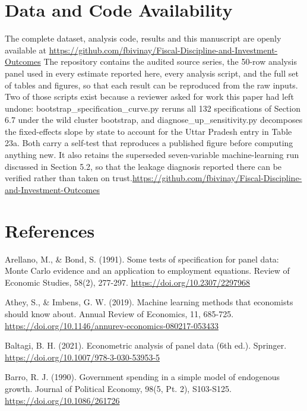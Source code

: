 \documentclass[12pt,a4paper]{article}
\begin{document}
\FloatBarrier
\section{Data and Code Availability}

The complete dataset, analysis code, results and this manuscript are openly available at \url{https://github.com/fbivinay/Fiscal-Discipline-and-Investment-Outcomes} The repository contains the audited source series, the 50-row analysis panel used in every estimate reported here, every analysis script, and the full set of tables and figures, so that each result can be reproduced from the raw inputs. Two of those scripts exist because a reviewer asked for work this paper had left undone: bootstrap\_specification\_curve.py reruns all 132 specifications of Section 6.7 under the wild cluster bootstrap, and diagnose\_up\_sensitivity.py decomposes the fixed-effects slope by state to account for the Uttar Pradesh entry in Table 23a. Both carry a self-test that reproduces a published figure before computing anything new. It also retains the superseded seven-variable machine-learning run discussed in Section 5.2, so that the leakage diagnosis reported there can be verified rather than taken on trust.\url{https://github.com/fbivinay/Fiscal-Discipline-and-Investment-Outcomes}

\FloatBarrier
\section*{References}
\small

\hangindent=0.5in
Arellano, M., \& Bond, S. (1991). Some tests of specification for panel data: Monte Carlo evidence and an application to employment equations. Review of Economic Studies, 58(2), 277-297. \url{https://doi.org/10.2307/2297968}

\hangindent=0.5in
Athey, S., \& Imbens, G. W. (2019). Machine learning methods that economists should know about. Annual Review of Economics, 11, 685-725. \url{https://doi.org/10.1146/annurev-economics-080217-053433}

\hangindent=0.5in
Baltagi, B. H. (2021). Econometric analysis of panel data (6th ed.). Springer. \url{https://doi.org/10.1007/978-3-030-53953-5}

\hangindent=0.5in
Barro, R. J. (1990). Government spending in a simple model of endogenous growth. Journal of Political Economy, 98(5, Pt. 2), S103-S125. \url{https://doi.org/10.1086/261726}
\end{document}
